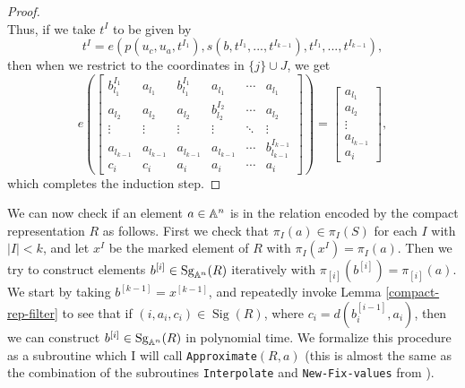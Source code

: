 \documentclass[letterpaper,11pt]{article}
\DeclareMathOperator{\Sg}{Sg}
\DeclareMathOperator{\Sig}{Sig}
\begin{document}
\begin{proof}
\[\]
Thus, if we take $t^I$ to be given by
\[
t^I = e(p(u_c,u_a,t^{I_1}), s(b, t^{I_1}, ..., t^{I_{k-1}}), t^{I_1}, ..., t^{I_{k-1}}),
\]
then when we restrict to the coordinates in $\{j\} \cup J$, we get
\[
e\left(\begin{bmatrix} b^{I_1}_{l_1} & a_{l_1} & b^{I_1}_{l_1} & a_{l_1} & \cdots & a_{l_1}\\ a_{l_2} & a_{l_2} & a_{l_2} & b^{I_2}_{l_2} & \cdots & a_{l_2}\\ \vdots & \vdots & \vdots & \vdots & \ddots & \vdots\\ a_{l_{k-1}} & a_{l_{k-1}} & a_{l_{k-1}} & a_{l_{k-1}} & \cdots & b^{I_{k-1}}_{l_{k-1}}\\ c_i & c_i & a_i & a_i & \cdots & a_i\end{bmatrix}\right) = \begin{bmatrix} a_{l_1}\\ a_{l_2}\\ \vdots\\ a_{l_{k-1}}\\ a_i\end{bmatrix},
\]
which completes the induction step.
\end{proof}

We can now check if an element $a \in \mathbb{A}^n$ is in the relation encoded by the compact representation $R$ as follows. First we check that $\pi_I(a) \in \pi_I(S)$ for each $I$ with $|I| < k$, and let $x^I$ be the marked element of $R$ with $\pi_I(x^I) = \pi_I(a)$. Then we try to construct elements $b^{[i]} \in \Sg_{\bA^n}(R)$ iteratively with $\pi_{[i]}(b^{[i]})= \pi_{[i]}(a)$. We start by taking $b^{[k-1]} = x^{[k-1]}$, and repeatedly invoke Lemma \ref{compact-rep-filter} to see that if $(i,a_i,c_i) \in \Sig(R)$, where $c_i = d(b^{[i-1]}_i,a_i)$, then we can construct $b^{[i]} \in \Sg_{\bA^n}(R)$ in polynomial time. We formalize this procedure as a subroutine which I will call \texttt{Approximate}$(R,a)$ (this is almost the same as the combination of the subroutines \texttt{Interpolate} and \texttt{New-Fix-values} from \cite{few-subpowers-algorithm}).%
\end{document}
